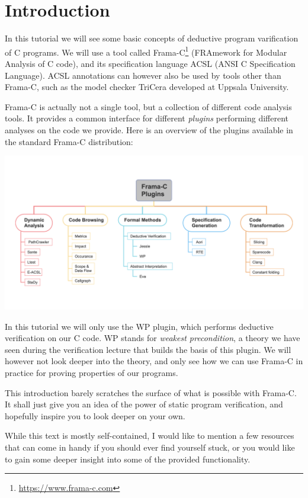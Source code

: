 \chapter{Introduction}

In this tutorial we will see some basic concepts of deductive program varification of C programs. We will use a tool called Frama-C\footnote{\url{https://www.frama-c.com}} (FRAmework for Modular Analysis of C code), and its specification language ACSL (ANSI C Specification Language). ACSL annotations can however also be used by tools other than Frama-C, such as the model checker TriCera \cite{esen2022tricera} developed at Uppsala University. 

Frama-C is actually not a single tool, but a collection of different code analysis tools. It provides a common interface for different \emph{plugins} performing different analyses on the code we provide. Here is an overview of the plugins available in the standard Frama-C distribution:

\begin{center}
    \includegraphics[width=\textwidth]{images/frama_c_plugins.png}
\end{center}

In this tutorial we will only use the WP plugin, which performs deductive verification on our C code. WP stands for \emph{weakest precondition}, a theory we have seen during the verification lecture that builds the basis of this plugin. We will however not look deeper into the theory, and only see how we can use Frama-C in practice for proving properties of our programs. 

This introduction barely scratches the surface of what is possible with Frama-C. It shall just give you an idea of the power of static program verification, and hopefully inspire you to look deeper on your own. 

While this text is mostly self-contained, I would like to mention a few resources that can come in handy if you should ever find yourself stuck, or you would like to gain some deeper insight into some of the provided functionality. 


